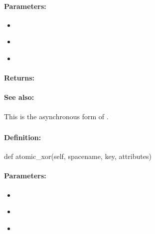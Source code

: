 \paragraph{Parameters:}
\begin{itemize}[noitemsep]
\item {}\\

\item {}\\

\item {}\\

\end{itemize}

\paragraph{Returns:}


\paragraph{See also:}  This is the asynchronous form of .

\pagebreak
\subsubsection{}
\label{api:python:atomic_xor}


\paragraph{Definition:}
\begin{pythoncode}
def atomic_xor(self, spacename, key, attributes)
\end{pythoncode}

\paragraph{Parameters:}
\begin{itemize}[noitemsep]
\item {}\\

\item {}\\

\item {}\\

\end{itemize}

